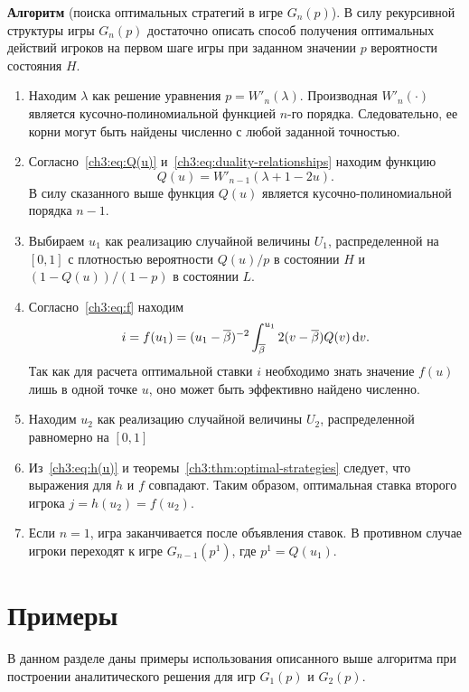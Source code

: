 {\noindent
\textbf{Алгоритм} (поиска оптимальных стратегий в игре $G_n(p)$).
В силу рекурсивной структуры игры $G_n(p)$ достаточно описать способ получения оптимальных действий игроков на первом шаге игры при заданном значении $p$ вероятности состояния $H$.
\begin{enumerate}
\item
  Находим $\lambda$ как решение уравнения 
  $
    p = W'_n(\lambda).
  $
  Производная $W'_n(\cdot)$ является кусочно-полиномиальной функцией $n$-го порядка.
  Следовательно, ее корни могут быть найдены численно с любой заданной точностью.
\item
  Согласно~\eqref{ch3:eq:Q(u)} и~\eqref{ch3:eq:duality-relationships} находим функцию 
  \[
    Q(u) = W'_{n-1}(\lambda + 1 - 2u).
  \]
  В силу сказанного выше функция $Q(u)$ является кусочно-полиномиальной порядка $n-1$.
\item
  Выбираем $u_1$ как реализацию случайной величины $U_1$, распределенной на $[0, 1]$ с плотностью вероятности $Q(u)/p$ в состоянии $H$ и $\left(1 - Q(u)\right)/(1-p)$ в состоянии $L$.
\item
  Согласно~\eqref{ch3:eq:f} находим 
  \[
    i = f(u_1) = (u_1 - {{\overline{\beta}}})^{-2} \int_{{{\overline{\beta}}}}^{u_1} 2 (v - {{\overline{\beta}}}) Q(v) \mathop{}\!\mathrm{d} v.
  \]
  Так как для расчета оптимальной ставки $i$ необходимо знать значение $f(u)$ лишь в одной точке $u$, оно может быть эффективно найдено численно.
\item
  Находим $u_2$ как реализацию случайной величины $U_2$, распределенной равномерно на $[0, 1]$
\item
  Из~\eqref{ch3:eq:h(u)} и теоремы~\ref{ch3:thm:optimal-strategies} следует, что выражения для $h$ и $f$ совпадают.
  Таким образом, оптимальная ставка второго игрока $j = h(u_2) = f(u_2)$.
\item
  Если $n = 1$, игра заканчивается после объявления ставок. В противном случае игроки переходят к игре $G_{n-1}(p^1)$, где $p^1 = Q(u_1)$.
\end{enumerate}

\section{Примеры}
В данном разделе даны примеры использования описанного выше алгоритма при построении аналитического решения для игр $G_1(p)$ и $G_2(p)$.

}
